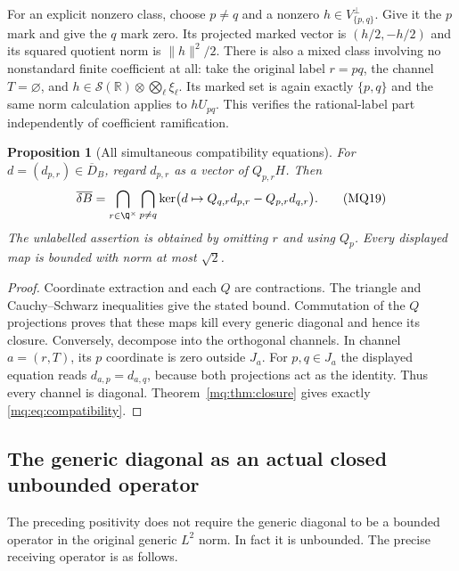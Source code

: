 \documentclass[11pt,a4paper]{article}
\newtheorem{proposition}[theorem]{Proposition}
\theoremstyle{definition}\newtheorem{definition}[theorem]{Definition}
\begin{document}
For an explicit nonzero class, choose $p\ne q$ and a nonzero
$h\in V_{\{p,q\}}^\perp$. Give it the $p$ mark and give the
$q$ mark zero. Its projected marked vector is $(h/2,-h/2)$
and its squared quotient norm is $\|h\|^2/2$. There is also a
mixed class involving no nonstandard finite coefficient at all:
take the original label $r=pq$, the channel $T=\varnothing$,
and $h\in\mathcal S(\mathbb R)\otimes\bigotimes_\ell\xi_\ell$.
Its marked set is again exactly $\{p,q\}$ and the same norm
calculation applies to $hU_{pq}$. This verifies the rational-label
part independently of coefficient ramification.

\begin{proposition}[All simultaneous compatibility equations]
\label{mq:prop:compatibility}
For $d=(d_{p,r})\in\overline D_B$, regard $d_{p,r}$ as a vector
of $Q_{p,r}H$. Then
\[
 \overline{\delta B}
 =\bigcap_{r\in\Q^\times}\bigcap_{p\ne q}
   \ker\bigl(d\mapsto Q_{q,r}d_{p,r}-Q_{p,r}d_{q,r}\bigr).
 \tag{MQ19}\label{mq:eq:compatibility}
\]
The unlabelled assertion is obtained by omitting $r$ and using
$Q_p$. Every displayed map is bounded with norm at most $\sqrt2$.
\end{proposition}
\begin{proof}
Coordinate extraction and each $Q$ are contractions. The triangle
and Cauchy--Schwarz inequalities give the stated bound. Commutation
of the $Q$ projections proves that these maps kill every generic
diagonal and hence its closure. Conversely, decompose into the
orthogonal channels. In channel $a=(r,T)$, its $p$ coordinate is
zero outside $J_a$. For $p,q\in J_a$ the displayed equation reads
$d_{a,p}=d_{a,q}$, because both projections act as the identity.
Thus every channel is diagonal. Theorem~\ref{mq:thm:closure} gives
exactly \eqref{mq:eq:compatibility}.
\end{proof}

\subsection{The generic diagonal as an actual closed unbounded operator}

The preceding positivity does not require the generic diagonal to
be a bounded operator in the original generic $L^2$ norm. In fact
it is unbounded. The precise receiving operator is as follows.
\end{document}
